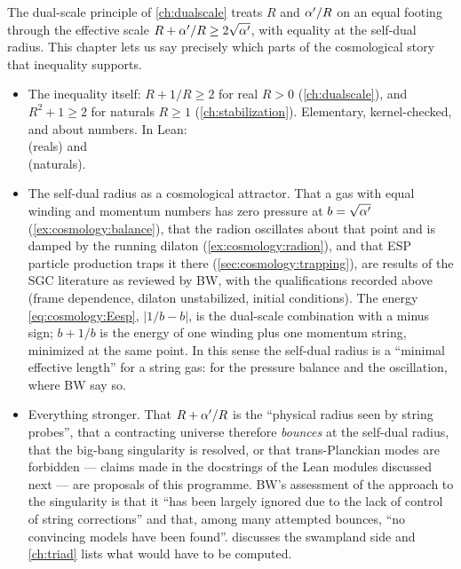The dual-scale principle of \cref{ch:dualscale} treats $R$ and $\alpha'/R$ on an equal footing
through the effective scale $R+\alpha'/R\ge2\sqrt{\alpha'}$, with equality at the self-dual radius.
This chapter lets us say precisely which parts of the cosmological story that inequality
supports.
\begin{itemize}[leftmargin=*,itemsep=2pt]
\item \TA{} The inequality itself: $R+1/R\ge2$ for real $R>0$ (\cref{ch:dualscale}), and
 $R^2+1\ge2$ for naturals $R\ge1$ (\cref{ch:stabilization}). Elementary, kernel-checked,
 and about numbers. In Lean:\\
  (reals) and\\
  (naturals).
\item \TL{} The self-dual radius as a cosmological attractor. That a gas with equal winding
 and momentum numbers has zero pressure at $b=\sqrt{\alpha'}$ (\cref{ex:cosmology:balance}),
 that the radion oscillates about that point and is damped by the running dilaton
 (\cref{ex:cosmology:radion}), and that ESP particle production traps it there
 (\cref{sec:cosmology:trapping}), are results of the SGC literature as reviewed by BW, with
 the qualifications recorded above (frame dependence, dilaton unstabilized, initial
 conditions). The energy \eqref{eq:cosmology:Eesp}, $|1/b-b|$, is the dual-scale
 combination with a minus sign; $b+1/b$ is the energy of one winding plus one momentum
 string, minimized at the same point. In this sense the self-dual radius is a ``minimal
 effective length'' for a string gas: \TL{} for the pressure balance and the oscillation,
 where BW say so.
\item \TC{} Everything stronger. That $R+\alpha'/R$ is the ``physical radius seen by string
 probes'', that a contracting universe therefore \emph{bounces} at the self-dual radius, that
 the big-bang singularity is resolved, or that trans-Planckian modes are forbidden --- claims
 made in the docstrings of the Lean modules discussed next --- are proposals of this
 programme. BW's assessment of the approach to the singularity is that it ``has been largely
 ignored due to the lack of control of string corrections'' and that, among many attempted
 bounces, ``no convincing models have been found''. 
  discusses the swampland side and \cref{ch:triad} lists what would have
 to be computed.
\end{itemize}


